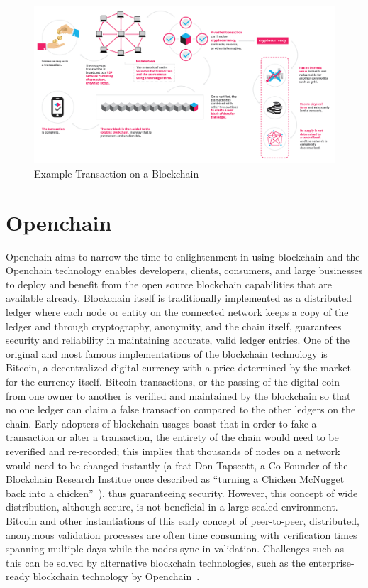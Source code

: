 \begin{figure}[!ht]
  \centering\includegraphics[width=\columnwidth]{../images/blockchainbasics.png}
  \caption{Example Transaction on a Blockchain~\cite{BlockchainImage}}\label{f:blockchainpng}
\end{figure}

\section{Openchain}
Openchain aims to narrow the time to enlightenment in using blockchain and the Openchain technology enables developers, clients, consumers, and large businesses to deploy and benefit from the open source blockchain capabilities that are available already. Blockchain itself is traditionally implemented as a distributed ledger where each node or entity on the connected network keeps a copy of the ledger and through cryptography, anonymity, and the chain itself, guarantees security and reliability in maintaining accurate, valid ledger entries. One of the original and most famous implementations of the blockchain technology is Bitcoin, a decentralized digital currency with a price determined by the market for the currency itself. Bitcoin transactions, or the passing of the digital coin from one owner to another is verified and maintained by the blockchain so that no one ledger can claim  a false transaction compared to the other ledgers on the chain. Early adopters of blockchain usages boast that in order to fake a transaction or alter a transaction, the entirety of the chain would need to be reverified and re-recorded; this implies that thousands of nodes on a network would need to be changed instantly (a feat Don Tapscott, a Co-Founder of the Blockchain Research Institue once described as ``turning a Chicken McNugget back into a chicken''~\cite{DonTapscottPBS}), thus guaranteeing security. However, this concept of wide distribution, although secure, is not beneficial in a large-scaled environment. Bitcoin and other instantiations of this early concept of peer-to-peer, distributed, anonymous validation processes are often time consuming with verification times spanning multiple days while the nodes sync in validation. Challenges such as this can be solved by alternative blockchain technologies, such as the enterprise-ready blockchain technology by Openchain~\cite{CoindeskCoinprism}.

